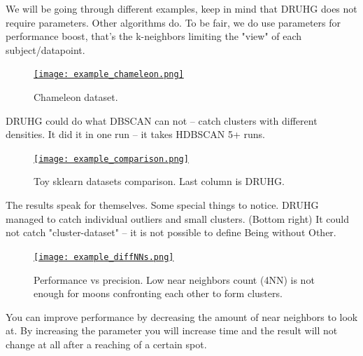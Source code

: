 \documentclass[12pt, a4paper, twocolumn]{article}
\newcommand{\githubPics}{https://raw.githubusercontent.com/artamono/druhg/master/papers/druhg/}
\begin{document}
We will be going through different examples, keep in mind that DRUHG does not require parameters. Other algorithms do. To be fair, we do use parameters for performance boost, that's the k-neighbors limiting the "view" of each subject/datapoint.

\begin{figure}[H]
  \centering
  \href{\githubPics example_chameleon.png}{\texttt{[image: example\_chameleon.png]}}
  \caption{Chameleon dataset.}
\end{figure}
DRUHG could do what DBSCAN can not -- catch clusters with different densities. It did it in one run -- it takes HDBSCAN 5+ runs.  

\begin{figure}[H]
  \centering
  \href{\githubPics example_comparison.png}{\texttt{[image: example\_comparison.png]}}
  \caption{Toy sklearn datasets comparison. Last column is DRUHG.}
\end{figure}
The results speak for themselves. Some special things to notice. DRUHG managed to catch individual outliers and small clusters. (Bottom right) It could not catch "cluster-dataset" -- it is not possible to define Being without Other.

\begin{figure}[H]
  \centering
  \href{\githubPics example_diffNNs.png}{\texttt{[image: example\_diffNNs.png]}}
  \caption{Performance vs precision. Low near neighbors count (4NN) is not enough for moons confronting each other to form clusters.}
\end{figure}
You can improve performance by decreasing the amount of near neighbors to look at. By increasing the parameter you will increase time and the result will not change at all after a reaching of a certain spot.
\end{document}
